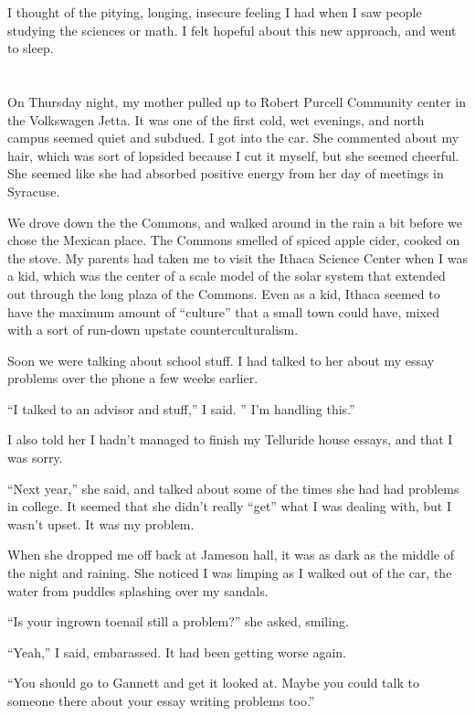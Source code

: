 I thought of the pitying, longing, insecure feeling I had when I saw people
studying the sciences or math.  I felt hopeful about this new approach, and went
to sleep. 

\section{}

On Thursday night, my mother pulled up to Robert Purcell Community center in the
Volkswagen Jetta.  It was one of the first cold, wet evenings, and north campus
seemed quiet and subdued.  I got into the car.  She commented about my hair,
which was sort of lopsided because I cut it myself, but she seemed cheerful.
She seemed like she had absorbed positive energy from her day of meetings in
Syracuse.  

We drove down the the Commons, and walked around in the rain a bit before we
chose the Mexican place.  The Commons smelled of spiced apple cider, cooked on
the stove.  My parents had taken me to visit the Ithaca Science Center when I
was a kid, which was the center of a scale model of the solar system that
extended out through the long plaza of the Commons.  Even as a kid, Ithaca
seemed to have the maximum amount of ``culture'' that a small town could have,
mixed with a sort of run-down upstate counterculturalism.

Soon we were talking about school stuff.  I had talked to her about my essay
problems over the phone a few weeks earlier. 

``I talked to an advisor and stuff,'' I said.   '' I'm handling this.''

I also told her I hadn't managed to finish my Telluride house essays, and that I
was sorry.  

``Next year,'' she said, and talked about some of the times she had had problems
in college.  It seemed that she didn't really ``get'' what I was dealing with,
but I wasn't upset.  It was my problem.

When she dropped me off back at Jameson hall, it was as dark as the middle of
the night and raining.  She noticed I was limping as I walked out of the car,
the water from puddles splashing over my sandals.

``Is your ingrown toenail still a problem?'' she asked, smiling.

``Yeah,'' I said, embarassed.  It had been getting worse again.  

``You should go to Gannett and get it looked at.  Maybe you could talk to
someone there about your essay writing problems too.''

